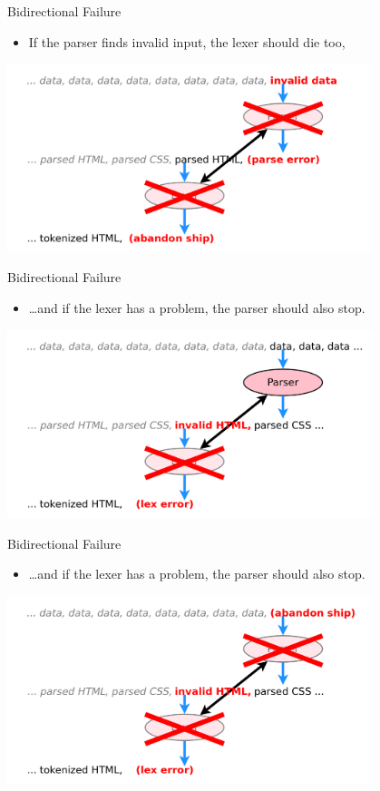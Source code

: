 \documentclass[xcolor=dvipsnames]{beamer}
\begin{document}
\begin{frame}{Bidirectional Failure}
	\begin{itemize}
		\item If the parser finds invalid input, the lexer should die too,
	\end{itemize}
	\begin{center}
	\includegraphics[width=0.8\textwidth]{parselex-3.png}
	\end{center}
\end{frame}
\begin{frame}{Bidirectional Failure}
	\begin{itemize}
		\item \dots and if the lexer has a problem, the parser should also stop.
	\end{itemize}
	\begin{center}
	\includegraphics[width=0.8\textwidth]{parselex-4.png}
	\end{center}
\end{frame}
\begin{frame}{Bidirectional Failure}
	\begin{itemize}
		\item \dots and if the lexer has a problem, the parser should also stop.
	\end{itemize}
	\begin{center}
	\includegraphics[width=0.8\textwidth]{parselex-5.png}
	\end{center}
\end{frame}
\end{document}
